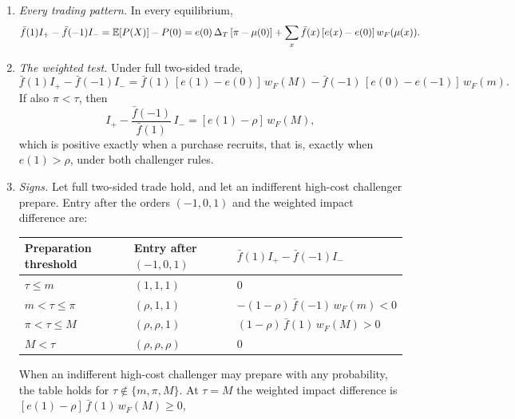 \begin{proposition}\label{prop:spread}
\leavevmode
\begin{enumerate}[label=(\roman*),leftmargin=2em]
\item \emph{Every trading pattern.} In every equilibrium,
\[
\bar f(1)I_+-\bar f(-1)I_-=\mathbb{E}[P(X)]-P(0)=e(0)\,\Delta_T\,[\pi-\mu(0)]+\sum_x\bar f(x)\,[e(x)-e(0)]\,w_F(\mu(x)).
\]
\item \emph{The weighted test.} Under full two-sided trade,
\[
\bar f(1)I_+-\bar f(-1)I_-=\bar f(1)\,[e(1)-e(0)]\,w_F(M)-\bar f(-1)\,[e(0)-e(-1)]\,w_F(m).
\]
If also \(\pi<\tau\), then
\[
I_+-\frac{\bar f(-1)}{\bar f(1)}\,I_-=[e(1)-\rho]\,w_F(M),
\]
which is positive exactly when a purchase recruits, that is, exactly when \(e(1)>\rho\), under both challenger rules.
\item \emph{Signs.} Let full two-sided trade hold, and let an indifferent high-cost challenger prepare. Entry after
the orders \((-1,0,1)\) and the weighted impact difference are:
\begin{center}
\begin{tabular}{@{}lll@{}}
\toprule
Preparation threshold & Entry after \((-1,0,1)\) & \(\bar f(1)I_+-\bar f(-1)I_-\)\\
\midrule
\(\tau\le m\) & \((1,1,1)\) & \(0\)\\
\(m<\tau\le\pi\) & \((\rho,1,1)\) & \(-(1-\rho)\,\bar f(-1)\,w_F(m)<0\)\\
\(\pi<\tau\le M\) & \((\rho,\rho,1)\) & \((1-\rho)\,\bar f(1)\,w_F(M)>0\)\\
\(M<\tau\) & \((\rho,\rho,\rho)\) & \(0\)\\
\bottomrule
\end{tabular}
\end{center}
When an indifferent high-cost challenger may prepare with any probability, the table holds for
\(\tau\notin\{m,\pi,M\}\). At \(\tau=M\) the weighted impact difference is \([e(1)-\rho]\,\bar f(1)\,w_F(M)\ge0\),

\end{enumerate}
\end{proposition}
